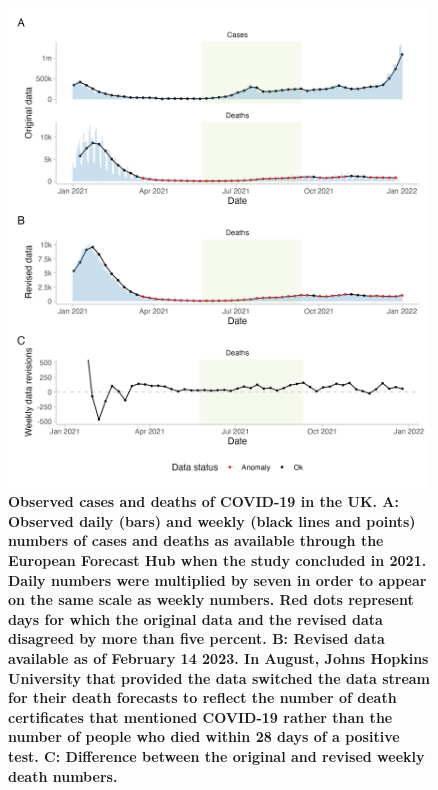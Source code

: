 \documentclass[10pt,a4paper,twocolumn]{article}
\begin{document}
\begin{figure}
\centering
\includegraphics[width=0.99\textwidth]{../output/figures/plot-data.png}
\caption{\bf{Observed cases and deaths of COVID-19 in the UK}. A: Observed daily (bars) and weekly (black lines and points) numbers of cases and deaths as available through the European Forecast Hub when the study concluded in 2021. Daily numbers were multiplied by seven in order to appear on the same scale as weekly numbers. Red dots represent days for which the original data and the revised data disagreed by more than five percent. B: Revised data available as of February 14 2023. In August, Johns Hopkins University that provided the data switched the data stream for their death forecasts to reflect the number of death certificates that mentioned COVID-19 rather than the number of people who died within 28 days of a positive test. C: Difference between the original and revised weekly death numbers.}
\label{fig:plot-data}
\end{figure}
\end{document}
